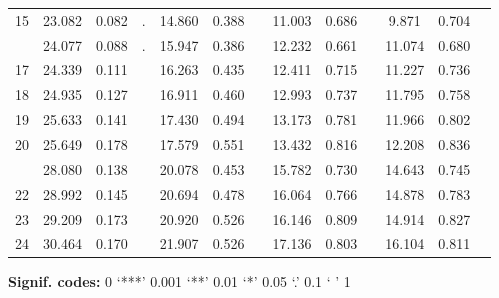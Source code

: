 \documentclass[]{article}
\begin{document}
\begin{table}[!h]
{\begin{threeparttable}
\begin{tabular}[t]{ccccccccccccc}
15 & 23.082 & 0.082 & . & 14.860 & 0.388 &  & 11.003 & 0.686 &  & 9.871 & 0.704 & \\
\addlinespace
16 & 24.077 & 0.088 & . & 15.947 & 0.386 &  & 12.232 & 0.661 &  & 11.074 & 0.680 & \\
17 & 24.339 & 0.111 &  & 16.263 & 0.435 &  & 12.411 & 0.715 &  & 11.227 & 0.736 & \\
18 & 24.935 & 0.127 &  & 16.911 & 0.460 &  & 12.993 & 0.737 &  & 11.795 & 0.758 & \\
19 & 25.633 & 0.141 &  & 17.430 & 0.494 &  & 13.173 & 0.781 &  & 11.966 & 0.802 & \\
20 & 25.649 & 0.178 &  & 17.579 & 0.551 &  & 13.432 & 0.816 &  & 12.208 & 0.836 & \\
\addlinespace
21 & 28.080 & 0.138 &  & 20.078 & 0.453 &  & 15.782 & 0.730 &  & 14.643 & 0.745 & \\
22 & 28.992 & 0.145 &  & 20.694 & 0.478 &  & 16.064 & 0.766 &  & 14.878 & 0.783 & \\
23 & 29.209 & 0.173 &  & 20.920 & 0.526 &  & 16.146 & 0.809 &  & 14.914 & 0.827 & \\
24 & 30.464 & 0.170 &  & 21.907 & 0.526 &  & 17.136 & 0.803 &  & 16.104 & 0.811 & \\
\bottomrule
\end{tabular}
\begin{tablenotes}
\item \hspace{-0.4cm}\textbf{Signif. codes: }0 `***' 0.001 `**' 0.01 `*' 0.05 `.' 0.1 ` ' 1
\end{tablenotes}
\end{threeparttable}}
\end{table}
\end{document}
